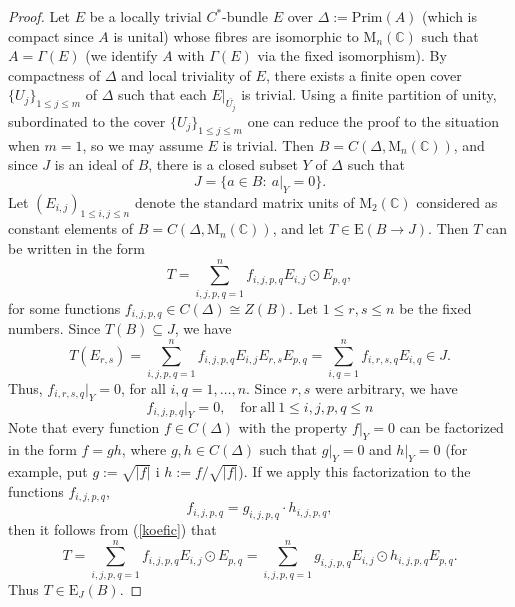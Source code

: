 \documentclass[]{amsart}
\theoremstyle{remark}
\theoremstyle{definition}
\theoremstyle{question}
\numberwithin{equation}{section}
\begin{document}
\begin{proof} Let $E$ be a locally trivial $C^*$-bundle $E$ over
$\Delta:=\mathrm{Prim}(A)$ (which is compact since $A$ is unital) whose fibres
are isomorphic to ${\mathrm{M}}_n({\mathbb{C}})$ such that
$A=\Gamma(E)$ (we identify $A$ with $\Gamma(E)$ via the fixed isomorphism). By
compactness of $\Delta$ and local triviality of $E$, there exists a
finite open cover $\{U_j\}_{1\leq j \leq m}$ of $\Delta$
such that each $E|_{\overline{U_j}}$ is trivial. Using a finite partition of
unity, subordinated to the cover
$\{U_j\}_{1\leq j \leq m}$ one can reduce the proof to the situation when $m=1$,
so we may assume $E$ is trivial. Then $B=C(\Delta, {\mathrm{M}}_n({\mathbb{C}}))$, and since $J$ is
an ideal of $B$,
there is a closed subset $Y$ of $\Delta$ such that
$$J=\{a \in B : \ a|_Y=0\}.$$
Let $(E_{i,j})_{1\leq i,j \leq n}$ denote the standard matrix units of ${\mathrm{M}}_2({\mathbb{C}})$ considered as constant elements of $B=C(\Delta,
{\mathrm{M}}_n({\mathbb{C}}))$, and let $T \in {\mathrm{E}}(B\rightarrow J)$. Then $T$ can be written in the form
\begin{equation}\label{koefic}
T=\sum_{i,j,p,q=1}^n f_{i,j,p,q} E_{i,j} \odot E_{p,q},
\end{equation}
for some functions $f_{i,j,p,q} \in C(\Delta)\cong Z(B)$. Let $1\leq r,s \leq n$
be the fixed numbers. Since $T(B) \subseteq J$, we have
$$T(E_{r,s})=\sum_{i,j,p,q=1}^n f_{i,j,p,q} E_{i,j} E_{r,s}
E_{p,q}=\sum_{i,q=1}^n f_{i,r,s,q}E_{i,q} \in J.$$
Thus, $f_{i,r,s,q}|_{ Y}=0$, for all $i,q=1, \ldots , n$. Since $r,s$ were
arbitrary, we have $$f_{i,j,p,q}|_ {Y}=0, \quad \mathrm{for} \ \mathrm{all} \
1\leq i,j,p,q\leq n$$
Note that every function $f \in C(\Delta)$ with the property $f|_{Y}=0$ can be
factorized in the form $f=gh$, where
 $g,h\in C(\Delta)$ such that $g|_{Y}=0$ and $h|_{Y}=0$ (for example, put
$g:=\sqrt{|f|}$ i $h:=f/\sqrt{|f|}$).
If we apply this factorization to the functions $f_{i,j,p,q}$, $$f_{i,j,p,q}=
g_{i,j,p,q}\cdot h_{i,j,p,q},$$ then it follows from (\ref{koefic})  that
$$T=\sum_{i,j,p,q=1}^n f_{i,j,p,q} E_{i,j} \odot E_{p,q}=\sum_{i,j,p,q=1}^n
g_{i,j,p,q}E_{i,j} \odot h_{i,j,p,q}E_{p,q}.$$
Thus $T \in {\mathrm{E}}_J(B)$.
\end{proof}
\end{document}
